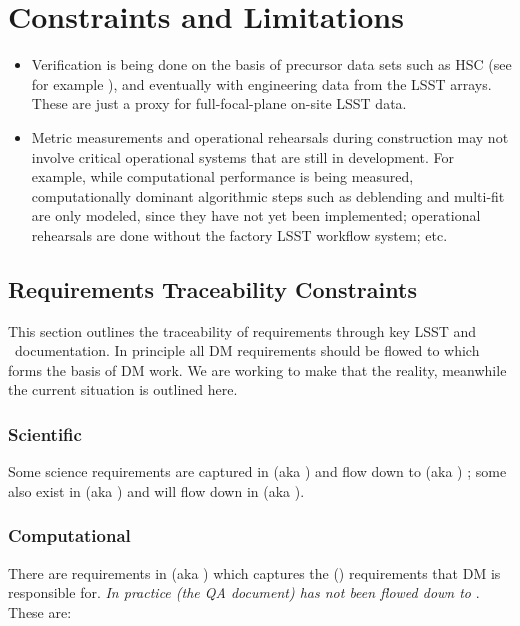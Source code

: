 \section{Constraints and Limitations}

\begin{itemize}

\item Verification is being done on the basis of precursor data sets such as HSC (see for example ), and eventually with engineering data from the LSST arrays. These are just a proxy for full-focal-plane on-site LSST data.

\item Metric measurements and operational rehearsals during construction may not involve critical operational systems that are still in development. For example, while computational performance is being measured, computationally dominant algorithmic steps such as deblending and multi-fit are only modeled, since they have not yet been implemented; operational rehearsals are done without the factory LSST workflow system; etc.

\end{itemize}

\subsection{Requirements Traceability Constraints}

This section outlines the traceability of requirements through key LSST and \product\ documentation.
In principle all DM requirements should be flowed to  which forms the basis of DM work. We are working to make that the reality, meanwhile the current situation is outlined here.

\subsubsection{Scientific}

Some science requirements are captured in  (aka \LSR) and flow down to  (aka \OSS) ; some also exist in  (aka \DPDD) and will flow down in  (aka \DMSR).

\subsubsection{Computational}

There are requirements in  (aka \DMSR) which captures the  (\OSS) requirements that DM is responsible for. \textit{In practice  (the QA document) has not been flowed down to }. These are:

